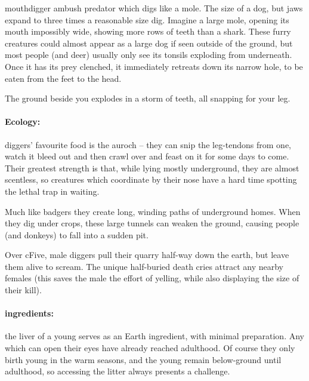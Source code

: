 \begin{multicols}{2}
\begin{itemize}
\end{itemize}

  {mouthdigger}%
  {ambush predator which digs like a mole.  The size of a dog, but jaws expand to three times a reasonable size}%
dig.
Imagine a large mole, opening its mouth impossibly wide, showing more rows of teeth than a shark.
These furry creatures could almost appear as a large dog if seen outside of the ground, but most people (and deer) usually only see its tonsils exploding from underneath.
Once it has its prey clenched, it immediately retreats down its narrow hole, to be eaten from the feet to the head.

\begin{boxtext}
  The ground beside you explodes in a storm of teeth, all snapping for your leg.
\end{boxtext}

\paragraph{Ecology:} \Glspl{digger}' favourite food is the auroch -- they can snip the leg-tendons from one, watch it bleed out and then crawl over and feast on it for some days to come.
Their greatest strength is that, while lying mostly underground, they are almost scentless, so creatures which coordinate by their nose have a hard time spotting the lethal trap in waiting.

Much like badgers they create long, winding paths of underground homes.
When they dig under crops, these large tunnels can weaken the ground, causing people (and donkeys) to fall into a sudden pit.

Over \gls{cFive}, male \glspl{digger} pull their quarry half-way down the earth, but leave them alive to scream.
The unique half-buried death cries attract any nearby females (this saves the male the effort of yelling, while also displaying the size of their kill).

\paragraph{\Glspl{ingredient}:}
the liver of a young  serves as an Earth \gls{ingredient}, with minimal preparation.
Any which can open their eyes have already reached adulthood.
Of course they only birth young in the warm seasons, and the young remain below-ground until adulthood, so accessing the litter always presents a challenge.


\end{multicols}
